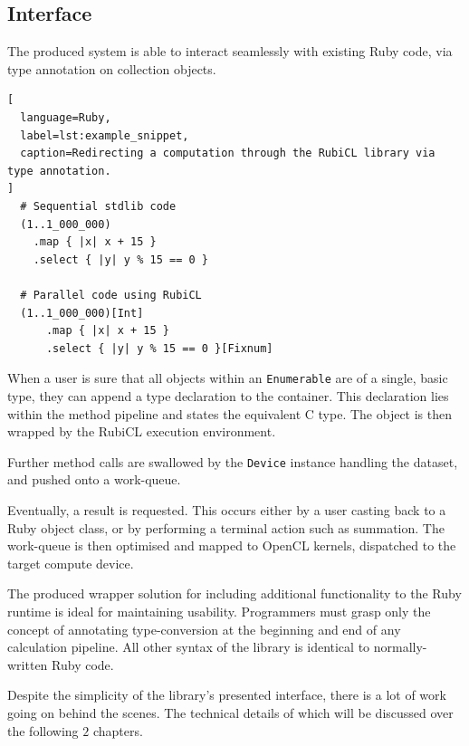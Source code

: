 \subsection{Interface}
The produced system is able to interact seamlessly with existing Ruby code, via type annotation on collection objects.

\begin{lstlisting}[
  language=Ruby,
  label=lst:example_snippet,
  caption=Redirecting a computation through the RubiCL library via type annotation.
]
  # Sequential stdlib code
  (1..1_000_000)
    .map { |x| x + 15 }
    .select { |y| y % 15 == 0 }

  # Parallel code using RubiCL
  (1..1_000_000)[Int]
      .map { |x| x + 15 }
      .select { |y| y % 15 == 0 }[Fixnum]
\end{lstlisting}


When a user is sure that all objects within an \verb|Enumerable| are of a single, basic type, they can append a type declaration to the container. This declaration lies within the method pipeline and states the equivalent C type. The object is then wrapped by the RubiCL execution environment.

Further method calls are swallowed by the \verb|Device| instance handling the dataset, and pushed onto a work-queue.

Eventually, a result is requested. This occurs either by a user casting back to a Ruby object class, or by performing a terminal action such as summation. The work-queue is then optimised and mapped to OpenCL kernels, dispatched to the target compute device.

The produced wrapper solution for including additional functionality to the Ruby runtime is ideal for maintaining usability. Programmers must grasp only the concept of annotating type-conversion at the beginning and end of any calculation pipeline. All other syntax of the library is identical to normally-written Ruby code.

Despite the simplicity of the library's presented interface, there is a lot of work going on behind the scenes. The technical details of which will be discussed over the following $2$ chapters.

